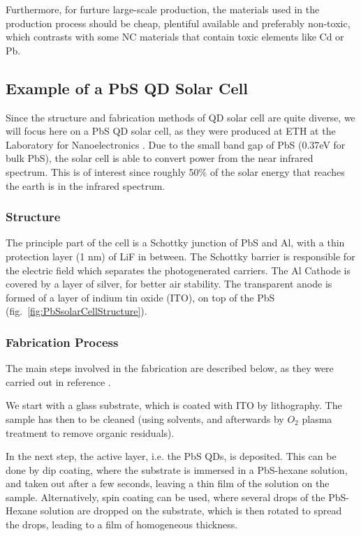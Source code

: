 Furthermore, for furture large-scale production, the materials used in the production process should be cheap, plentiful available and preferably non-toxic, which contrasts with some NC materials that contain toxic elements like Cd or Pb.

\subsection{Example of a PbS QD Solar Cell}

Since the structure and fabrication methods of QD solar cell are quite diverse, we will focus here on a PbS QD solar cell, as they were produced at ETH at the Laboratory for Nanoelectronics \cite{MS_Michael}. Due to the small band gap of PbS (0.37eV for bulk PbS), the solar cell is able to convert power from the near infrared spectrum. This is of interest since roughly 50\% of the solar energy that reaches the earth is in the infrared spectrum.

\subsubsection{Structure}

The principle part of the cell is a Schottky junction of PbS and Al, with a thin protection layer (1 nm) of LiF in between. The Schottky barrier is responsible for the electric field which separates the photogenerated carriers. The Al Cathode is covered by a layer of silver, for better air stability. The transparent anode is formed of a layer of indium tin oxide (ITO), on top of the PbS (fig.~\ref{fig:PbSsolarCellStructure}).

\subsubsection{Fabrication Process}

The main steps involved in the fabrication are described below, as they were carried out in reference \cite{MS_Michael}.

We start with a glass substrate, which is coated with ITO by lithography. The sample has then to be cleaned (using solvents, and afterwards by $O_2$ plasma treatment to remove organic residuals). 

In the next step, the active layer, i.e. the PbS QDs, is deposited. This can be done by dip coating, where the substrate is immersed in a PbS-hexane solution, and taken out after a few seconds, leaving a thin film of the solution on the sample. Alternatively, spin coating can be used, where several drops of the PbS-Hexane solution are dropped on the substrate, which is then rotated to spread the drops, leading to a film of homogeneous thickness. 

